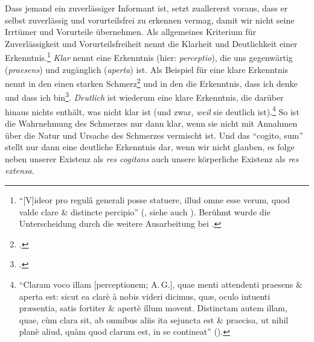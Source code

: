 \begin{nummerierung}
 Dass jemand ein zuverlässiger Informant ist, setzt zuallererst voraus, dass er
 selbst zuverlässig und vorurteilsfrei zu erkennen vermag, damit wir nicht seine Irrtümer und
 Vorurteile übernehmen. Als allgemeines Kriterium für Zuverlässigkeit und
 Vorurteilsfreiheit nennt  die Klarheit und Deutlichkeit einer
 Erkenntnis.\footnote{\enquote{[V]ideor pro regul{\^a} generali posse statuere,
 illud omne esse verum, quod valde clare {\&} distincte percipio}
 \mkbibparens{\cite[][VII:
 35.14--15]{Descartes:OeuvresdeDescartes1983}, siehe auch
 \cite[][VIII:
 16.18--17.10]{Descartes:OeuvresdeDescartes1983}}. Berühmt wurde die
 Unterscheidung durch die weitere Ausarbeitung bei
 \textcite[vgl.][]{Leibniz:Meditationesdecognitioneveritateetideis1999}.}
 \emph{Klar} nennt  eine Erkenntnis (hier:
 \emph{perceptio}), die uns gegenwärtig (\emph{praesens}) und zugänglich
 (\emph{aperta}) ist. Als Beispiel für eine klare Erkenntnis nennt
  in den  einen starken
 Schmerz\footnote{\cite[Vgl.][VIII:
 22.10--11]{Descartes:OeuvresdeDescartes1983}.} und in den  die Erkenntnis, dass ich denke und dass ich 
 bin\footnote{\cite[Vgl.][VII:  35.3--15]{Descartes:OeuvresdeDescartes1983}.}.
 \emph{Deutlich} ist wiederum eine klare Erkenntnis, die darüber hinaus nichts
 enthält, was nicht klar ist (und zwar, \emph{weil} sie deutlich
 ist).\footnote{\enquote{Claram voco illam
 [perceptionem; A.\,G.], quae menti attendenti praesens {\&} aperta est:
 sicut ea clar{\`e} {\`a} nobis videri dicimus, qu{\ae}, oculo intuenti
 pr{\ae}sentia, satis fortiter {\&} apert{\`e} illum movent. Distinctam autem
 illam, quae, c{\`u}m clara sit, ab omnibus aliis ita sejuncta est {\&}
 praecisa, ut nihil plan{\`e} aliud, qu{\`a}m quod clarum est, in se contineat}
 \mkbibparens{\cite[][VIII: 22.3--9]{Descartes:OeuvresdeDescartes1983}}.} So ist die
 Wahrnehmung des Schmerzes nur dann klar, wenn sie nicht mit Annahmen über die Natur und Ursache des Schmerzes
 vermischt ist. Und das \enquote{cogito, sum} stellt nur dann eine deutliche
 Erkenntnis dar, wenn wir nicht glauben, es folge neben unserer Existenz als
 \emph{res cogitans} auch unsere körperliche Existenz als \emph{res extensa}.
 

\end{nummerierung}

